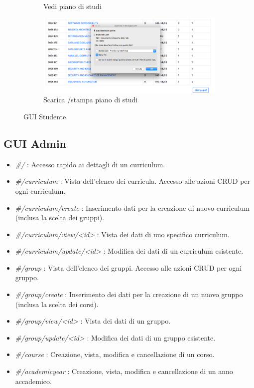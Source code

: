 \documentclass{article}
\begin{document}
\begin{figure}[!h]
\begin{subfigure}[b]{0.475\textwidth}
            \caption[]%
            {{\small Vedi piano di studi}}    
            \label{fig:Studyplan}
        \end{subfigure}
        \quad
        \begin{subfigure}[b]{0.475\textwidth}   
            \centering 
            \includegraphics[width=\textwidth]{img/print.png}
            \caption[]%
            {{\small Scarica /stampa piano di studi }}    
            \label{fig:Print}
        \end{subfigure}
        \caption[  ]
        {\small GUI Studente} 
        \label{fig:Student GUI}
    \end{figure}

\newpage
\subsection{GUI Admin}

\begin{itemize}
\item \emph{\#/} : Accesso rapido ai dettagli di un curriculum.
\item \emph{\#/curriculum} : Vista dell'elenco dei curricula. Accesso alle azioni CRUD per ogni curriculum.
\item \emph{\#/curriculum/create} : Inserimento dati per la creazione di nuovo curriculum (inclusa la scelta dei gruppi).
\item \emph{\#/curriculum/view/<id>} : Vista dei dati di uno specifico curriculum.
\item \emph{\#/curriculum/update/<id>} : Modifica dei dati di un curriculum esistente.
\item \emph{\#/group} : Vista dell'elenco dei gruppi. Accesso alle azioni CRUD per ogni gruppo.
\item \emph{\#/group/create} : Inserimento dei dati per la creazione di un nuovo gruppo (inclusa la scelta dei corsi).
\item \emph{\#/group/view/<id>} : Vista dei dati di un gruppo.
\item \emph{\#/group/update/<id>} : Modifica dei dati di un gruppo esistente.
\item \emph{\#/course} : Creazione, vista, modifica e cancellazione di un corso.
\item \emph{\#/academicyear} :  Creazione, vista, modifica e cancellazione di un anno accademico.
\end{itemize}
\end{document}
